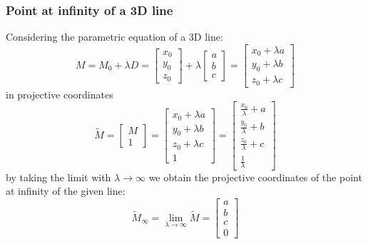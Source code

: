 \documentclass{article}
\begin{document}
\subsubsection{Point at infinity of a 3D line}
Considering the parametric equation of a 3D line:
\begin{equation}
	M = M_0 + \lambda D = \begin{bmatrix}
	x_0\\
	y_0\\
	z_0
	\end{bmatrix} + \lambda \begin{bmatrix}
	a\\
	b\\
	c
	\end{bmatrix} = \begin{bmatrix}
	x_0 + \lambda a \\
	y_0 + \lambda b \\
	z_0 + \lambda c 
	\end{bmatrix}
\end{equation}
in projective coordinates
\begin{equation}
	\tilde{M} = \begin{bmatrix}
	M\\
	1
	\end{bmatrix} = \begin{bmatrix}
	x_0 + \lambda a \\
	y_0 + \lambda b \\
	z_0 + \lambda c \\
	1
	\end{bmatrix} = \begin{bmatrix}
	\frac{x_0}{\lambda} + a\\
	\frac{y_0}{\lambda} + b\\
	\frac{z_0}{\lambda} + c\\
	\frac{1}{\lambda}
	\end{bmatrix}
\end{equation}
by taking the limit with $\lambda \rightarrow \infty$ we obtain the projective coordinates of the point at infinity of the given line:
\begin{equation}
	\tilde{M}_{\infty}= \lim_{\lambda \to \infty} \tilde{M} = \begin{bmatrix}
	a\\
	b\\
	c\\
	0
	\end{bmatrix}
\end{equation}
\end{document}
